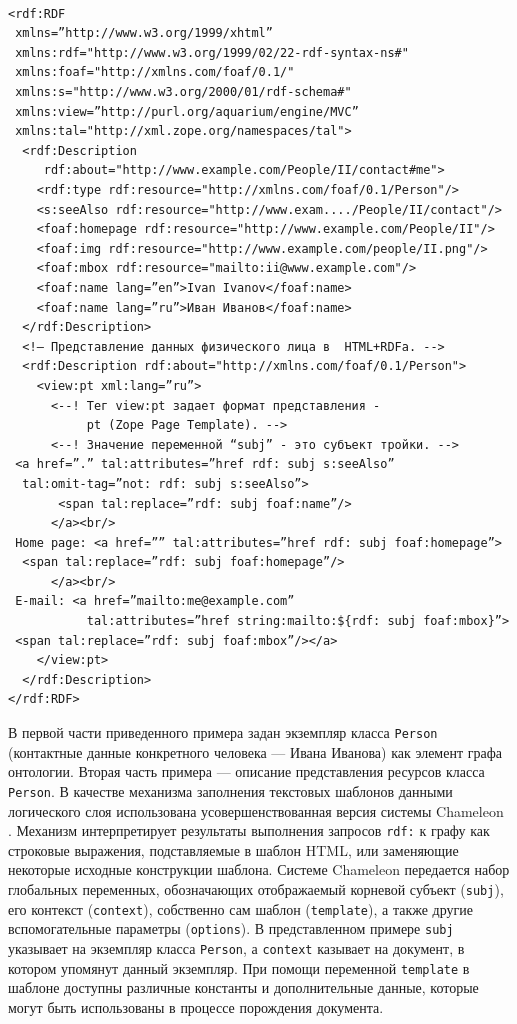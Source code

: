 \documentclass[utf8]{../IncArticle}
\begin{document}
\begingroup%
\tt%
\begin{verbatim}
<rdf:RDF
 xmlns=”http://www.w3.org/1999/xhtml”
 xmlns:rdf="http://www.w3.org/1999/02/22-rdf-syntax-ns#"
 xmlns:foaf="http://xmlns.com/foaf/0.1/"
 xmlns:s="http://www.w3.org/2000/01/rdf-schema#"
 xmlns:view=”http://purl.org/aquarium/engine/MVC”
 xmlns:tal="http://xml.zope.org/namespaces/tal">
  <rdf:Description
     rdf:about="http://www.example.com/People/II/contact#me">
    <rdf:type rdf:resource="http://xmlns.com/foaf/0.1/Person"/>
    <s:seeAlso rdf:resource="http://www.exam..../People/II/contact"/>
    <foaf:homepage rdf:resource="http://www.example.com/People/II"/>
    <foaf:img rdf:resource="http://www.example.com/people/II.png"/>
    <foaf:mbox rdf:resource="mailto:ii@www.example.com"/>
    <foaf:name lang=”en”>Ivan Ivanov</foaf:name>
    <foaf:name lang=”ru”>Иван Иванов</foaf:name>
  </rdf:Description>
  <!— Представление данных физического лица в  HTML+RDFa. -->
  <rdf:Description rdf:about="http://xmlns.com/foaf/0.1/Person">
    <view:pt xml:lang=”ru”>
      <--! Тег view:pt задает формат представления -
           pt (Zope Page Template). -->
      <--! Значение переменной “subj” - это субъект тройки. -->
 <a href=”.” tal:attributes=”href rdf: subj s:seeAlso”
  tal:omit-tag=”not: rdf: subj s:seeAlso”>
       <span tal:replace=”rdf: subj foaf:name”/>
      </a><br/>
 Home page: <a href=”” tal:attributes=”href rdf: subj foaf:homepage”>
  <span tal:replace=”rdf: subj foaf:homepage”/>
      </a><br/>
 E-mail: <a href=”mailto:me@example.com”
           tal:attributes=”href string:mailto:${rdf: subj foaf:mbox}”>
 <span tal:replace=”rdf: subj foaf:mbox”/></a>
    </view:pt>
  </rdf:Description>
</rdf:RDF>
\end{verbatim}%
\endgroup

В первой части приведенного примера задан экземпляр класса
\texttt{Person} (контактные данные конкретного человека --- Ивана
Иванова) как элемент графа онтологии.  Вторая часть примера ---
описание представления ресурсов класса \texttt{Person}.  В качестве
механизма заполнения текстовых шаблонов данными логического слоя
использована усовершенствованная версия системы Chameleon \cite{q2}.
Механизм интерпретирует результаты выполнения запросов \texttt{rdf:} к
графу как строковые выражения, подставляемые в шаблон HTML, или
заменяющие некоторые исходные конструкции шаблона.  Системе Chameleon передается
набор глобальных переменных, обозначающих отображаемый корневой
субъект (\texttt{subj}), его контекст (\texttt{context}), собственно
сам шаблон (\texttt{template}), а также другие вспомогательные
параметры (\texttt{options}).  В представленном примере \texttt{subj}
указывает на экземпляр класса \texttt{Person}, а \texttt{context}
казывает на документ, в котором упомянут данный экземпляр.  При помощи
переменной \texttt{template} в шаблоне доступны различные константы и
дополнительные данные, которые могут быть использованы в процессе
порождения документа.
\end{document}
